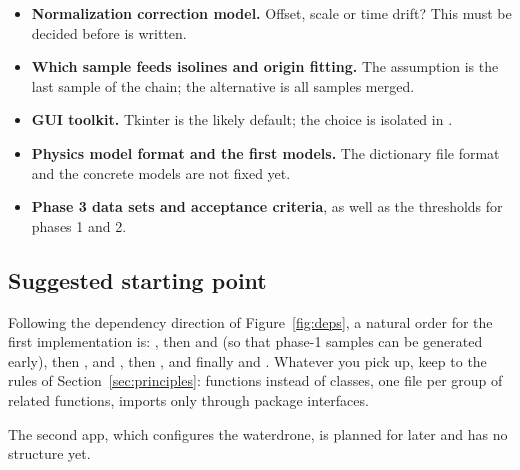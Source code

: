 \documentclass{article}
\begin{document}
\begin{itemize}
\item \textbf{Normalization correction model.} Offset, scale or time drift?
      This must be decided before  is
      written.
\item \textbf{Which sample feeds isolines and origin fitting.} The assumption
      is the last sample of the chain; the alternative is all samples merged.
\item \textbf{GUI toolkit.} Tkinter is the likely default; the choice is
      isolated in .
\item \textbf{Physics model format and the first models.} The dictionary file
      format and the concrete models are not fixed yet.
\item \textbf{Phase 3 data sets and acceptance criteria}, as well as the
      thresholds for phases 1 and 2.
\end{itemize}

\subsection{Suggested starting point}

Following the dependency direction of Figure~\ref{fig:deps}, a natural order
for the first implementation is: , then  and
 (so that phase-1 samples can be generated early), then
,  and , then
, and finally  and . Whatever you pick up,
keep to the rules of Section~\ref{sec:principles}: functions instead of
classes, one file per group of related functions, imports only through
package interfaces.

The second app, which configures the waterdrone, is planned for later and has
no structure yet.
\end{document}
